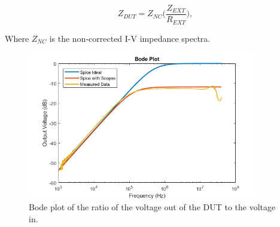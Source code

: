 \begin{equation}
    Z_{DUT} = Z_{NC}\bigg(\frac{Z_{EXT}}{R_{EXT}}\bigg),
\end{equation}

\noindent Where $Z_{NC}$ is the non-corrected I-V impedance spectra.



\begin{figure}[h]
    \centering
    \includegraphics[width=0.9\textwidth]{images/spice-measured-comp.png}
    \caption{Bode plot of the ratio of the voltage out of the DUT to the voltage in.}
    \label{fig:test_circuit_bode}
\end{figure}



